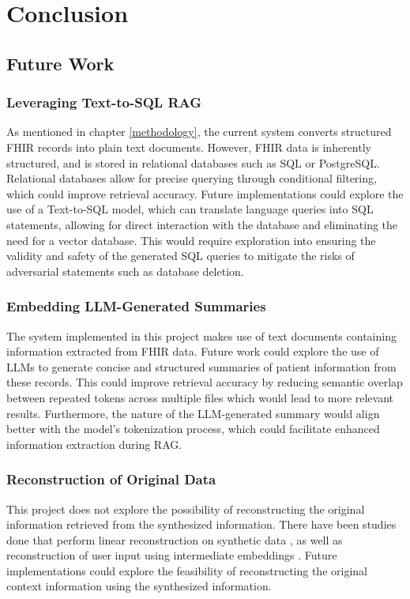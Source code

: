 \chapter{Conclusion} \label{conclusion}

\section{Future Work}

\subsection{Leveraging Text-to-SQL RAG}
As mentioned in chapter \ref{methodology}, the current system converts structured FHIR records into plain text documents. However, FHIR data is inherently structured, and is stored in relational databases such as SQL or PostgreSQL. Relational databases allow for precise querying through conditional filtering, which could improve retrieval accuracy. Future implementations could explore the use of a Text-to-SQL model, which can translate language queries into SQL statements, allowing for direct interaction with the database and eliminating the need for a vector database. This would require exploration into ensuring the validity and safety of the generated SQL queries to mitigate the risks of adversarial statements such as database deletion.

\subsection{Embedding LLM-Generated Summaries}
The system implemented in this project makes use of text documents containing information extracted from FHIR data.
Future work could explore the use of LLMs to generate concise and structured summaries of patient information from these records.
This could improve retrieval accuracy by reducing semantic overlap between repeated tokens across multiple files which would lead to more relevant results.
Furthermore, the nature of the LLM-generated summary would align better with the model's tokenization process, which could facilitate enhanced information extraction during RAG.

\subsection{Reconstruction of Original Data}
This project does not explore the possibility of reconstructing the original information retrieved from the synthesized information. There have been studies done that perform linear reconstruction on synthetic data \autocite{annamalai2024linearreconstructionapproachattribute}, as well as reconstruction of user input using intermediate embeddings \autocite{zheng2023inputreconstructionattackvertical}. Future implementations could explore the feasibility of reconstructing the original context information using the synthesized information.
